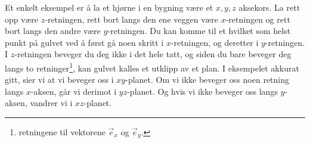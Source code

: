 Et enkelt eksempel er å la et hjørne i en bygning være et $ x, y, z $ aksekors. La rett opp være $ z $-retningen, rett bort langs den ene veggen være $ x $-retningen og rett bort langs den andre være $ y $-retningen. Du kan komme til et hvilket som helst punkt på gulvet ved å først gå noen skritt i $ x $-retningen, og deretter i $ y $-retningen. I $ z $-retningen beveger du deg ikke i det hele tatt, og siden du bare beveger deg langs to  retninger\footnote{retningene til vektorene $ \vec{e}_x $ og $ \vec{e}_y $.}, kan gulvet kalles et utklipp av et plan.
I eksempelet akkurat gitt, sier vi at vi beveger oss i $ xy$-planet. Om vi ikke beveger oss noen retning langs $ x $-aksen, går vi derimot i $ yz $-planet. Og hvis vi ikke beveger oss langs $ y $-aksen, vandrer vi i $ xz $-planet.\vsk

